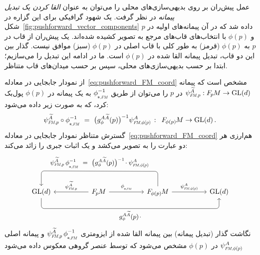 عمل پیش‌ران بر روی بدیهی‌سازی‌های محلی را می‌توان به عنوان \emph{القا کردن یک تبدیل پیمانه} در نظر گرفت.
یک شهود گرافیکی برای این گزاره در شکل~\ref{fig:pushforward_vector_components} داده شد که در آن پیمانه‌های اولیه در $p$ و $\phi(p)$ با انتخاب‌های قاب‌های مرجع به تصویر کشیده شده‌اند.
یک پیش‌ران از قاب در $p$ به $\phi(p)$ (قرمز) به طور کلی با قاب اصلی در $\phi(p)$ (سبز) موافق نیست.
گذار بین این دو قاب، تبدیل پیمانه القا شده در $\phi(p)$ است.
ما در ادامه این تبدیل را می‌سازیم؛ ابتدا بر حسب بدیهی‌سازی‌های محلی، سپس بر حسب میدان‌های قاب متناظر.


از نمودار جابجایی در معادله~\eqref{eq:pushforward_FM_coord} مشخص است که پیمانه $\psiFMp^{\widetilde{A}}: \FpM \to \GL{d}$ در $p$ را می‌توان از طریق $\dphiFM^{-1}$ به یک پیمانه در $\phi(p)$ پول‌بک کرد، که به صورت زیر داده می‌شود:
\begin{align}\label{eq:isom_pullback_section_FM}
    \psiFMp^{\widetilde{A}} \circ \dphiFM^{-1}
    \ =\ \big( g_\phi^{A\widetilde{A}}(p) \big)^{-1} \psiFMphip^A
    \,:\,\ \FphipM \to \GL{d} \,.
\end{align}
گسترش متناظر نمودار جابجایی در معادله~\eqref{eq:pushforward_FM_coord} هم‌ارزی هر دو عبارت را به تصویر می‌کشد و یک اثبات جبری را زائد می‌کند:
\begin{equation}\label{cd:pushforward_FM_coord_extended}
    \begin{tikzcd}[row sep=4.em, column sep=5em]
        \GL{d}
            \arrow[rrr, pos=.5, rounded corners, to path={ 
                    -- ([yshift=-3.5ex]\tikztostart.south) 
                    --node[below]{\small$
                        g_\phi^{A\widetilde{A}}(p) \mkern2mu\cdot
                        $} ([yshift=-3.5ex]\tikztotarget.south) 
                    -- (\tikztotarget.south)
                    }]
        &
        \FpM
            \arrow[l, "\psiFMp^{\widetilde{A}}"']
            \arrow[r, "\dphiFM"]
        &
        \FphipM
            \arrow[r, "\psiFMphip^A"]
            \arrow[ll, pos=.5, rounded corners, to path={ 
                    -- ([yshift=5.ex]\tikztostart.north) 
                    --node[above]{\small$
                        \psiFMp^{\widetilde{A}}\, \dphiFM^{-1}\ =\ 
                        \big( g_\phi^{A\widetilde{A}}(p) \big)^{-1} \mkern-2mu\cdot \psiFMphip^A
                        $} ([yshift=5.ex]\tikztotarget.north) 
                    -- (\tikztotarget.north)
                    }]
        &
        \GL{d}
    \end{tikzcd}
\end{equation}
نگاشت گذار (تبدیل پیمانه) بین پیمانه القا شده از ایزومتری $\psiFMp^{\widetilde{A}} \, \dphiFM^{-1}$ و پیمانه اصلی $\psiFMphip^A$ در $\phi(p)$ مشخص می‌شود که توسط عنصر گروهی معکوس داده می‌شود%
